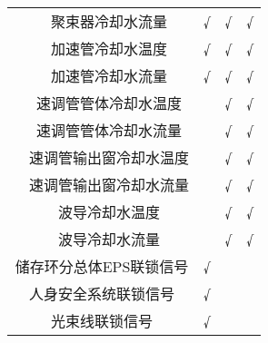 \begin{table}[!htb]
\begin{tabular}{|l|c|l|l|l|}
                                                                                    & 聚束器冷却水流量    &    \multicolumn{1}{c|}{√}      &   \multicolumn{1}{c|}{√}      &    \multicolumn{1}{c|}{√}     \\ \cline{2-5} 
                                                                                    & 加速管冷却水温度    &  \multicolumn{1}{c|}{√}        &  \multicolumn{1}{c|}{√}       &    \multicolumn{1}{c|}{√}     \\ \cline{2-5} 
                                                                                    & 加速管冷却水流量    &    \multicolumn{1}{c|}{√}      &   \multicolumn{1}{c|}{√}      &   \multicolumn{1}{c|}{√}      \\ \cline{2-5} 
                                                                                    & 速调管管体冷却水温度  &          &   \multicolumn{1}{c|}{√}      &    \multicolumn{1}{c|}{√}     \\ \cline{2-5} 
                                                                                    & 速调管管体冷却水流量  &          &   \multicolumn{1}{c|}{√}      &   \multicolumn{1}{c|}{√}      \\ \cline{2-5} 
                                                                                    & 速调管输出窗冷却水温度 &          &   \multicolumn{1}{c|}{√}      &    \multicolumn{1}{c|}{√}     \\ \cline{2-5} 
                                                                                    & 速调管输出窗冷却水流量 &          &   \multicolumn{1}{c|}{√}      &   \multicolumn{1}{c|}{√}      \\ \cline{2-5} 
                                                                                    & 波导冷却水温度     &          &  \multicolumn{1}{c|}{√}       &   \multicolumn{1}{c|}{√}      \\ \cline{2-5} 
                                                                                    & 波导冷却水流量     &          &   \multicolumn{1}{c|}{√}      &   \multicolumn{1}{c|}{√}      \\ \hline
\multicolumn{2}{|c|}{储存环分总体EPS联锁信号}                                                               &   \multicolumn{1}{c|}{√}       &        &        \\ \hline
\multicolumn{2}{|c|}{人身安全系统联锁信号}                                                                  &   \multicolumn{1}{c|}{√}       &        &        \\ \hline
\multicolumn{2}{|c|}{光束线联锁信号}                                                                     &  \multicolumn{1}{c|}{√}        &        &        \\ \hline
\end{tabular}
\end{table}

